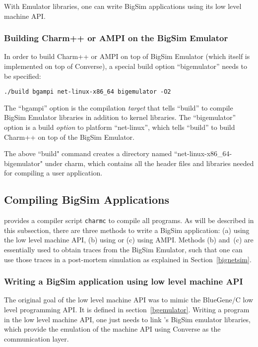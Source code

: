 With Emulator libraries, one can write BigSim applications using its
low level machine API.

\subsubsection{Building Charm++ or AMPI on the BigSim Emulator}

In order to build Charm++ or AMPI on top of BigSim Emulator (which itself is
implemented on top of Converse), a special build option ``bigemulator'' needs
to be specified:
\begin{verbatim}
./build bgampi net-linux-x86_64 bigemulator -O2
\end{verbatim}

The ``bgampi'' option is the compilation {\em target} that tells ``build'' to
compile BigSim Emulator libraries in addition to \charmpp{} kernel libraries.
The ``bigemulator'' option is a build {\em option} to platform ``net-linux'',
which tells ``build'' to build Charm++ on top of the BigSim Emulator. 

The above ``build" command creates a directory named
``net-linux-x86\_64-bigemulator" under charm, which contains all the header
files and libraries needed for compiling a user application.

\subsection{Compiling BigSim Applications}

\charmpp{} provides a compiler script {\tt charmc} to compile all programs.  As
will be described in this subsection, there are three methods to write a BigSim
application: (a) using the low level machine API, (b) using \charmpp{} or (c)
using AMPI. Methods (b) and~(c) are essentially used to obtain traces from the
BigSim Emulator, such that one can use those traces in a post-mortem simulation
as explained in Section~\ref{bignetsim}.

\subsubsection{Writing a BigSim application using low level machine API}
The original goal of the low level machine API was to mimic the BlueGene/C low
level programming API. It is defined in section~\ref{bgemulator}. Writing a
program in the low level machine API, one just needs to link \charmpp{}'s
BigSim emulator libraries, which provide the emulation of the machine API using
Converse as the communication layer.

